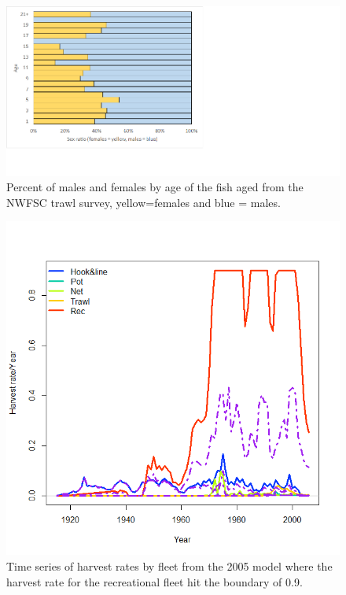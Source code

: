 \documentclass[12pt,]{article}
\begin{document}
\begin{figure}[htbp]
\centering
\includegraphics{Figures/sex_ratio.png}
\caption{Percent of males and females by age of the fish aged from the
NWFSC trawl survey, yellow=females and blue = males.
\label{fig:sex_ratio}}
\end{figure}

\FloatBarrier

\begin{figure}[htbp]
\centering
\includegraphics{Figures/bridge_harvestrate.png}
\caption{Time series of harvest rates by fleet from the 2005 model where
the harvest rate for the recreational fleet hit the boundary of 0.9.
\label{fig:bridge_harvestrate}}
\end{figure}
\end{document}
